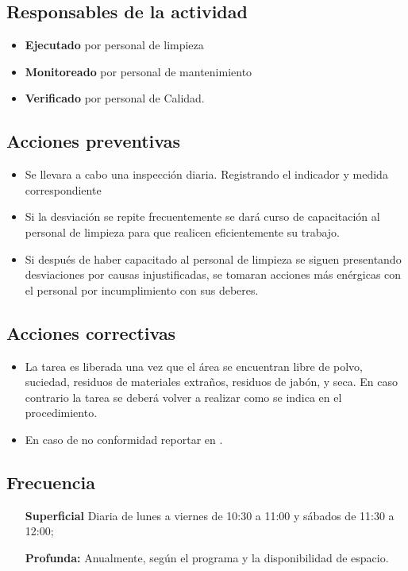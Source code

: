 \subsection{Responsables de la actividad}
\begin{itemize}
	\item \textbf{Ejecutado} por personal de limpieza
	\item \textbf{Monitoreado} por personal de mantenimiento
	\item \textbf{Verificado} por personal de Calidad.
\end{itemize}

\subsection{Acciones preventivas}

\begin{itemize}
	\item Se llevara a cabo una inspección diaria. Registrando el indicador y medida correspondiente
	\item Si la desviación se repite frecuentemente se dará curso de capacitación al personal de limpieza para que realicen eficientemente su trabajo.
	\item Si después de haber capacitado al personal de limpieza se siguen presentando desviaciones por causas injustificadas, se tomaran acciones más enérgicas con el personal por incumplimiento con sus deberes.
\end{itemize}

\subsection{Acciones correctivas}

\begin{itemize}
	\item La tarea es liberada una vez que el área se encuentran libre de polvo, suciedad, residuos de materiales extraños, residuos de jabón, y seca. En caso contrario la tarea se deberá volver a realizar como se indica en el procedimiento.
	\item En caso de no conformidad reportar en \RAC.
\end{itemize}

\subsection{Frecuencia}

\begin{itemize}
	\item[\textbf{Superficial}] Diaria de lunes a viernes de 10:30 a 11:00 y sábados de 11:30 a 12:00;
	\item[\textbf{Profunda:}] Anualmente, según el programa y la disponibilidad de espacio.
\end{itemize}

